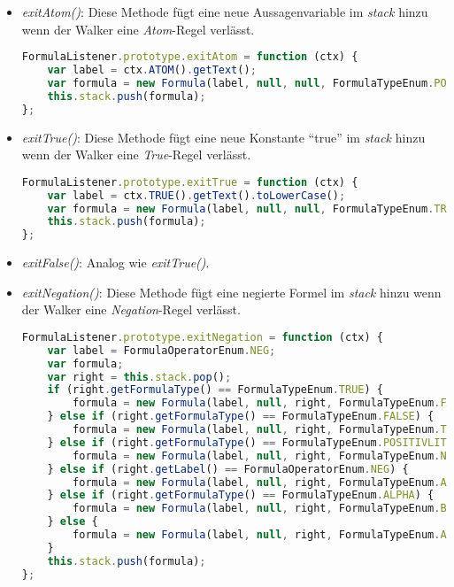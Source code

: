 \begin{itemize}

\item	\textit{exitAtom()}: Diese Methode fügt eine neue Aussagenvariable im \textit{stack} hinzu wenn der Walker eine \textit{Atom}-Regel verlässt.
\begin{lstlisting}[language=JavaScript, caption= exitAtom() (Klasse FormulaListener), basicstyle=\scriptsize]
FormulaListener.prototype.exitAtom = function (ctx) {
    var label = ctx.ATOM().getText();
    var formula = new Formula(label, null, null, FormulaTypeEnum.POSITIVLITERAL);
    this.stack.push(formula);
};
\end{lstlisting}

\item	\textit{exitTrue()}: Diese Methode fügt eine neue Konstante ``true'' im \textit{stack} hinzu wenn der Walker eine \textit{True}-Regel verlässt.
\begin{lstlisting}[language=JavaScript, caption= exitTrue() (Klasse FormulaListener), basicstyle=\scriptsize]
FormulaListener.prototype.exitTrue = function (ctx) {
    var label = ctx.TRUE().getText().toLowerCase();
    var formula = new Formula(label, null, null, FormulaTypeEnum.TRUE);
    this.stack.push(formula);
};
\end{lstlisting}

\item	\textit{exitFalse()}: Analog wie \textit{exitTrue()}. 

\item 	\textit{exitNegation()}: Diese Methode fügt eine negierte Formel im \textit{stack} hinzu wenn der Walker eine \textit{Negation}-Regel verlässt.
\begin{lstlisting}[language=JavaScript, caption= exitNegation() (Klasse FormulaListener), basicstyle=\scriptsize]
FormulaListener.prototype.exitNegation = function (ctx) {
    var label = FormulaOperatorEnum.NEG;
    var formula;
    var right = this.stack.pop();
    if (right.getFormulaType() == FormulaTypeEnum.TRUE) {
        formula = new Formula(label, null, right, FormulaTypeEnum.FALSE);
    } else if (right.getFormulaType() == FormulaTypeEnum.FALSE) {
        formula = new Formula(label, null, right, FormulaTypeEnum.TRUE);
    } else if (right.getFormulaType() == FormulaTypeEnum.POSITIVLITERAL) {
        formula = new Formula(label, null, right, FormulaTypeEnum.NEGATIVLITERAL);
    } else if (right.getLabel() == FormulaOperatorEnum.NEG) {
        formula = new Formula(label, null, right, FormulaTypeEnum.ALPHA);
    } else if (right.getFormulaType() == FormulaTypeEnum.ALPHA) {
        formula = new Formula(label, null, right, FormulaTypeEnum.BETA);
    } else {
        formula = new Formula(label, null, right, FormulaTypeEnum.ALPHA);
    }
    this.stack.push(formula);
};
\end{lstlisting}


\end{itemize}
